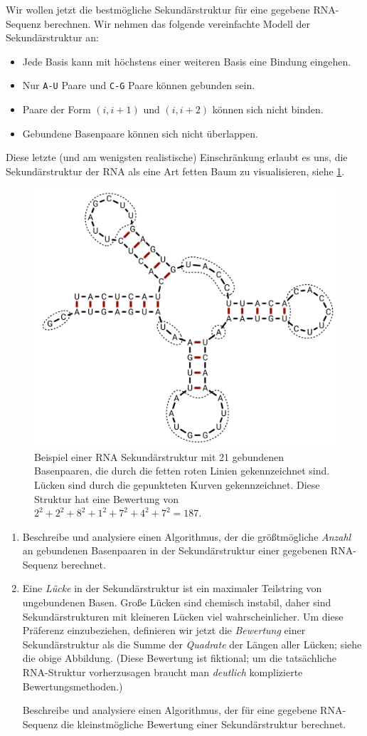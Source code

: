 \documentclass{uebung_cs}
\begin{document}
\begin{aufgabe}[Sekundärstruktur]
    Wir wollen jetzt die bestmögliche Sekundärstruktur für eine gegebene RNA-Sequenz berechnen. Wir nehmen das folgende vereinfachte Modell der Sekundärstruktur an:
    \begin{itemize}
        \item Jede Basis kann mit höchstens einer weiteren Basis eine Bindung eingehen.
        \item Nur \verb|A-U| Paare und \verb|C-G| Paare können gebunden sein.
        \item Paare der Form $(i,i+1)$ und $(i,i+2)$ können sich nicht binden.
        \item Gebundene Basenpaare können sich nicht überlappen.
    \end{itemize}
    Diese letzte (und am wenigsten realistische) Einschränkung erlaubt es uns, die Sekundärstruktur der RNA als eine Art fetten Baum zu visualisieren, siehe \cref{fig:RNA}.
    \begin{figure}[ht]
        \begin{center}
            \includegraphics[width=.5\textwidth]{RNA-secondary-structure.png}
        \end{center}
    \caption{\label{fig:RNA}Beispiel einer RNA Sekundärstruktur mit 21 gebundenen Basenpaaren, die durch die fetten roten Linien gekennzeichnet sind. Lücken sind durch die gepunkteten Kurven gekennzeichnet. Diese Struktur hat eine Bewertung von $2^2+2^2+8^2+1^2+7^2+4^2+7^2=187$.}
    \end{figure}
    \begin{enumerate}
        \item\mittel Beschreibe und analysiere einen Algorithmus, der die größtmögliche \emph{Anzahl} an gebundenen Basenpaaren in der Sekundärstruktur einer gegebenen RNA-Sequenz berechnet.
        \item\note Eine \emph{Lücke} in der Sekundärstruktur ist ein maximaler Teilstring von ungebundenen Basen. Große Lücken sind chemisch instabil, daher sind Sekundärstrukturen mit kleineren Lücken viel wahrscheinlicher.
        Um diese Präferenz einzubeziehen, definieren wir jetzt die \emph{Bewertung} einer Sekundärstruktur als die Summe der \emph{Quadrate} der Längen aller Lücken; siehe die obige Abbildung. (Diese Bewertung ist fiktional; um die tatsächliche RNA-Struktur vorherzusagen braucht man \emph{deutlich} komplizierte Bewertungsmethoden.)
    
        Beschreibe und analysiere einen Algorithmus, der für eine gegebene RNA-Sequenz die kleinstmögliche Bewertung einer Sekundärstruktur berechnet.
    \end{enumerate}
\end{aufgabe}
\end{document}
